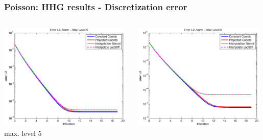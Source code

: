 \documentclass[t,compress=false,usepdftitle=false]{beamer}
\begin{document}
%
%
\begin{frame}\frametitle{Poisson: HHG results - Discretization error}

\begin{columns}[T] 
\begin{column}[T]{4.3cm} 
  \centering
  \includegraphics[width=0.98\textwidth]{spherepoisson_errorEuc_level5}\\
  max. level 5
\end{column}\hfill
\begin{column}[T]{4.3cm} 
  \centering
  \includegraphics[width=0.98\textwidth]{spherepoisson_errorEuc_level6}\\

\end{column}
\end{columns}
\end{frame}
\end{document}
